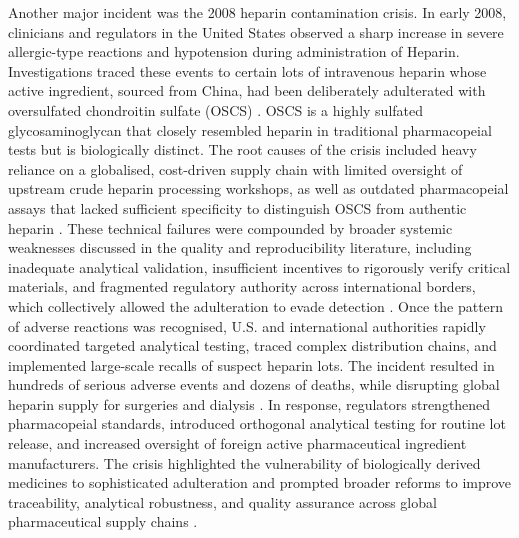Another major incident was the 2008 heparin contamination crisis. In early 2008, clinicians and regulators in the United States observed a sharp increase in severe allergic-type reactions and hypotension during administration of Heparin. Investigations traced these events to certain lots of intravenous heparin whose active ingredient, sourced from China, had been deliberately adulterated with oversulfated chondroitin sulfate (OSCS) \cite{Liu_2009, Kishimoto_2008}. OSCS is a highly sulfated glycosaminoglycan that closely resembled heparin in traditional pharmacopeial tests but is biologically distinct. The root causes of the crisis included heavy reliance on a globalised, cost-driven supply chain with limited oversight of upstream crude heparin processing workshops, as well as outdated pharmacopeial assays that lacked sufficient specificity to distinguish OSCS from authentic heparin \cite{Liu_2009}. These technical failures were compounded by broader systemic weaknesses discussed in the quality and reproducibility literature, including inadequate analytical validation, insufficient incentives to rigorously verify critical materials, and fragmented regulatory authority across international borders, which collectively allowed the adulteration to evade detection \cite{Liu_2009, Szajek_2016}. Once the pattern of adverse reactions was recognised, U.S. and international authorities rapidly coordinated targeted analytical testing, traced complex distribution chains, and implemented large-scale recalls of suspect heparin lots. The incident resulted in hundreds of serious adverse events and dozens of deaths, while disrupting global heparin supply for surgeries and dialysis \cite{Liu_2009, Kishimoto_2008}. In response, regulators strengthened pharmacopeial standards, introduced orthogonal analytical testing for routine lot release, and increased oversight of foreign active pharmaceutical ingredient manufacturers. The crisis highlighted the vulnerability of biologically derived medicines to sophisticated adulteration and prompted broader reforms to improve traceability, analytical robustness, and quality assurance across global pharmaceutical supply chains \cite{Liu_2009, Szajek_2016}.

